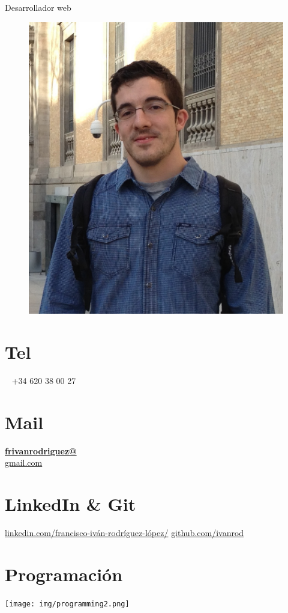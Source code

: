 \documentclass[]{friggeri-cv}
\begin{document}
      {Desarrollador web}
      

\begin{aside}
  \begin{figure}
    \includegraphics[width=0.6\columnwidth]{foto.png}
  \end{figure}
  
  \section{Tel}%
   ~
    +34 620 38 00 27
    ~
  \section{Mail}
    \href{mailto:frivanrodriguez@gmail.com}{\textbf{frivanrodriguez@}\\gmail.com}
    ~
  \section{LinkedIn \& Git}
    \href{es.linkedin.com/pub/francisco-iván-rodríguez-lópez/}{linkedin.com/francisco-iván-rodríguez-lópez/}
    \href{https://github.com/ivanrod}{github.com/ivanrod}
    ~
  \section{Programación}
    \texttt{[image: img/programming2.png]}
    ~

\end{aside}
\end{document}
